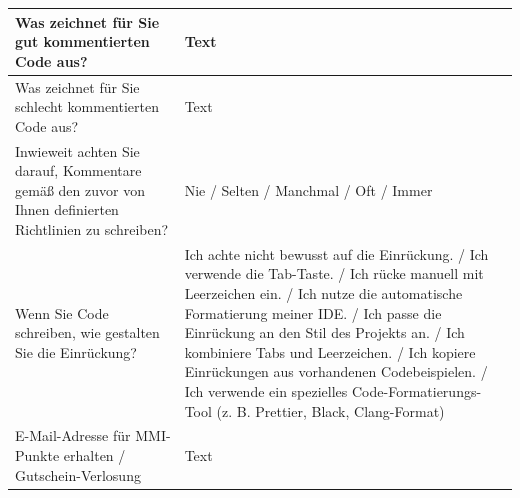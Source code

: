 \begin{table}[htbp]
{\begin{minipage}{\textwidth}
\begin{longtable}{|p{6cm}|p{6cm}|}
Was zeichnet für Sie gut kommentierten Code aus? & Text \\
\hline
Was zeichnet für Sie schlecht kommentierten Code aus? & Text \\
\hline
Inwieweit achten Sie darauf, Kommentare gemäß den zuvor von Ihnen definierten Richtlinien zu schreiben? & Nie / Selten / Manchmal / Oft / Immer \\
\hline
Wenn Sie Code schreiben, wie gestalten Sie die Einrückung? & Ich achte nicht bewusst auf die Einrückung. / Ich verwende die Tab-Taste. / Ich rücke manuell mit Leerzeichen ein. / Ich nutze die automatische Formatierung meiner IDE. / Ich passe die Einrückung an den Stil des Projekts an. / Ich kombiniere Tabs und Leerzeichen. / Ich kopiere Einrückungen aus vorhandenen Codebeispielen. / Ich verwende ein spezielles Code-Formatierungs-Tool (z. B. Prettier, Black, Clang-Format) \\
\hline
E-Mail-Adresse für MMI-Punkte erhalten / Gutschein-Verlosung & Text \\
\hline
\end{longtable}
\end{minipage}%
}
\end{table}


